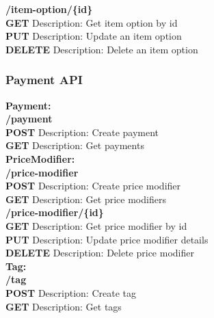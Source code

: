 \documentclass[11pt,a4paper,pdftex]{article}
\begin{document}
\hspace*{1em}\textbf{/item-option/\{id\}}\\
\hspace*{2em}\textbf{GET} Description: Get item option by id\\
\hspace*{2em}\textbf{PUT} Description: Update an item option\\
\hspace*{2em}\textbf{DELETE} Description: Delete an item option\\

\subsubsection{Payment API}

\textbf{Payment:}\\
\hspace*{1em}\textbf{/payment}\\
\hspace*{2em}\textbf{POST} Description: Create payment\\
\hspace*{2em}\textbf{GET} Description: Get payments\\



\textbf{PriceModifier:}\\
\hspace*{1em}\textbf{/price-modifier}\\
\hspace*{2em}\textbf{POST} Description: Create price modifier\\
\hspace*{2em}\textbf{GET} Description: Get price modifiers\\

\hspace*{1em}\textbf{/price-modifier/\{\textbf{id}\}}\\
\hspace*{2em}\textbf{GET} Description: Get price modifier by id\\
\hspace*{2em}\textbf{PUT} Description: Update price modifier details\\
\hspace*{2em}\textbf{DELETE} Description: Delete price modifier\\


\textbf{Tag:}\\
\hspace*{1em}\textbf{/tag}\\
\hspace*{2em}\textbf{POST} Description: Create tag\\
\hspace*{2em}\textbf{GET} Description: Get tags\\
\end{document}
